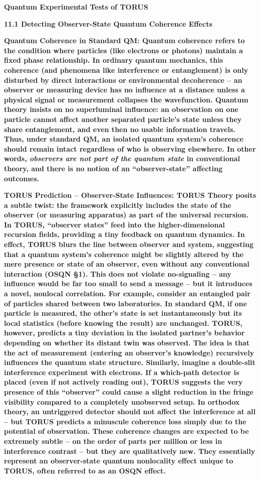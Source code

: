 \documentclass[
]{article}
\author{}
\date{}
\begin{document}
\textbf{Quantum Experimental Tests of TORUS}

\textbf{11.1 Detecting Observer-State Quantum Coherence Effects}

\textbf{Quantum Coherence in Standard QM: Quantum coherence refers to
the condition where particles (like electrons or photons) maintain a
fixed phase relationship. In ordinary quantum mechanics, this coherence
(and phenomena like interference or entanglement) is only disturbed by
direct interactions or environmental decoherence -- an observer or
measuring device has no influence at a distance unless a physical signal
or measurement collapses the wavefunction. Quantum theory insists on no
superluminal influence: an observation on one particle cannot affect
another separated particle's state unless they share entanglement, and
even then no usable information travels. Thus, under standard QM, an
isolated quantum system's coherence should remain intact regardless of
who is observing elsewhere. In other words, \emph{observers are not part
of the quantum state} in conventional theory, and there is no notion of
an ``observer-state'' affecting outcomes.}

\textbf{TORUS Prediction -- Observer-State Influences: TORUS Theory
posits a subtle twist: the framework explicitly includes the state of
the observer (or measuring apparatus) as part of the universal
recursion. In TORUS, ``observer states'' feed into the
higher-dimensional recursion fields, providing a tiny feedback on
quantum dynamics. In effect, TORUS blurs the line between observer and
system, suggesting that a quantum system's coherence might be slightly
altered by the mere presence or state of an observer, even without any
conventional interaction (OSQN §1). This does not violate no-signaling
-- any influence would be far too small to send a message -- but it
introduces a novel, nonlocal correlation. For example, consider an
entangled pair of particles shared between two laboratories. In standard
QM, if one particle is measured, the other's state is set
instantaneously but its local statistics (before knowing the result) are
unchanged. TORUS, however, predicts a tiny deviation in the isolated
partner's behavior depending on whether its distant twin was observed.
The idea is that the act of measurement (entering an observer's
knowledge) recursively influences the quantum state structure.
Similarly, imagine a double-slit interference experiment with electrons.
If a which-path detector is placed (even if not actively reading out),
TORUS suggests the very presence of this ``observer'' could cause a
slight reduction in the fringe visibility compared to a completely
unobserved setup. In orthodox theory, an untriggered detector should not
affect the interference at all -- but TORUS predicts a minuscule
coherence loss simply due to the potential of observation. These
coherence changes are expected to be extremely subtle -- on the order of
parts per million or less in interference contrast -- but they are
qualitatively new. They essentially represent an observer-state quantum
nonlocality effect unique to TORUS, often referred to as an OSQN
effect.}
\end{document}
